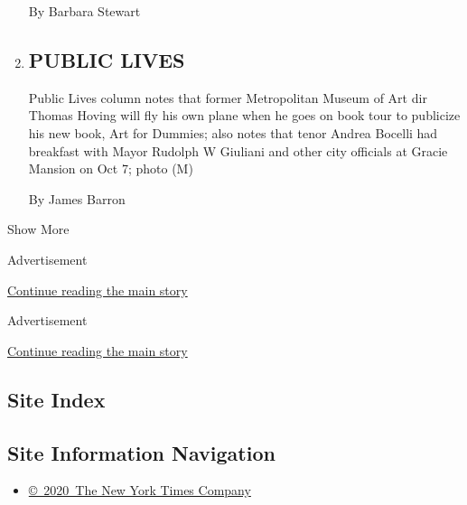 \begin{enumerate}
  By Barbara Stewart
\item
  \href{/1999/10/08/nyregion/public-lives.html}{}

  \hypertarget{public-lives}{%
  \subsection{PUBLIC LIVES}\label{public-lives}}

  Public Lives column notes that former Metropolitan Museum of Art dir
  Thomas Hoving will fly his own plane when he goes on book tour to
  publicize his new book, Art for Dummies; also notes that tenor Andrea
  Bocelli had breakfast with Mayor Rudolph W Giuliani and other city
  officials at Gracie Mansion on Oct 7; photo (M)

  By James Barron
\end{enumerate}

Show More

Advertisement

\protect\hyperlink{after-mid1}{Continue reading the main story}

Advertisement

\protect\hyperlink{after-mktg}{Continue reading the main story}

\hypertarget{site-index}{%
\subsection{Site Index}\label{site-index}}

\hypertarget{site-information-navigation}{%
\subsection{Site Information
Navigation}\label{site-information-navigation}}

\begin{itemize}
\tightlist
\item
  \href{https://help.nytimes3xbfgragh.onion/hc/en-us/articles/115014792127-Copyright-notice}{©~2020~The
  New York Times Company}
\end{itemize}


